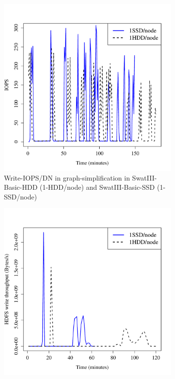 \documentclass[conference]{IEEEtran}
\begin{document}
\begin{figure}[htb]
\begin{subfigure}[b]{0.23\textwidth}
                \includegraphics[width=\textwidth]{Figure/SystemData/Plots/ECHddSsdWrIops.pdf}
                \caption{Write-IOPS/DN in graph-simplification in SwatIII-Basic-HDD (1-HDD/node) and SwatIII-Basic-SSD (1-SSD/node)}
                \label{fig:ECHddSsdWrIops}
        \end{subfigure}
        \begin{subfigure}[b]{0.23\textwidth}
                \includegraphics[width=\textwidth]{Figure/SystemData/Plots/BGHddSsdHdfsWrIops.pdf}

\end{subfigure}
\end{figure}
\end{document}

